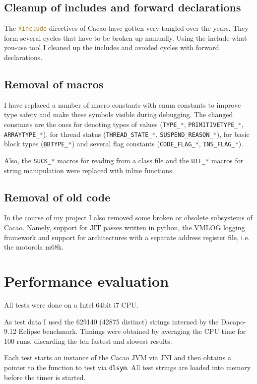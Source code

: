 \documentclass[12pt,a4paper,oneside]{article}
\newcommand{\cpp}[1]{\lstinline[language=C++]{#1}}
\begin{document}
\subsection{Cleanup of includes and forward declarations}
	The \cpp{#include} directives of Cacao have gotten very tangled over the years.
	They form several cycles that have to be broken up manually.
	Using the include-what-you-use\cite{iwyu} tool I cleaned up the includes and avoided cycles with forward declarations.

\subsection{Removal of macros}
	I have replaced a number of macro constants with enum constants to improve type safety and make these symbols visible during 
	debugging.
	The changed constants are the ones for denoting types of values (\cpp{TYPE_*}, \cpp{PRIMITIVETYPE_*}, \cpp{ARRAYTYPE_*}), for 
	thread status (\cpp{THREAD_STATE_*}, \cpp{SUSPEND_REASON_*}), for basic block types (\cpp{BBTYPE_*}) and several flag constants
	(\cpp{CODE_FLAG_*}, \cpp{INS_FLAG_*}).
	
	Also, the \cpp{SUCK_*} macros for reading from a class file and the \cpp{UTF_*} macros for string manipulation were replaced with inline functions.

\subsection{Removal of old code}
	In the course of my project I also removed some broken or obsolete subsystems of Cacao.
	Namely, support for JIT passes written in python, the VMLOG logging framework and 
	support for architectures with a separate address register file, i.e. the motorola m68k.

\clearpage

\section{Performance evaluation}
	All tests were done on a Intel 64bit i7 CPU.

	As test data I used the 629140 (42875 distinct) strings interned by the Dacapo-9.12\cite{DaCapo} Eclipse benchmark.
	Timings were obtained by averaging the CPU time for 100 runs, discarding the ten fastest and slowest results.	

	Each test starts an instance of the Cacao JVM via JNI and then obtains a pointer to the function to test via \cpp{dlsym}.
	All test strings are loaded into memory before the timer is started.
\end{document}
